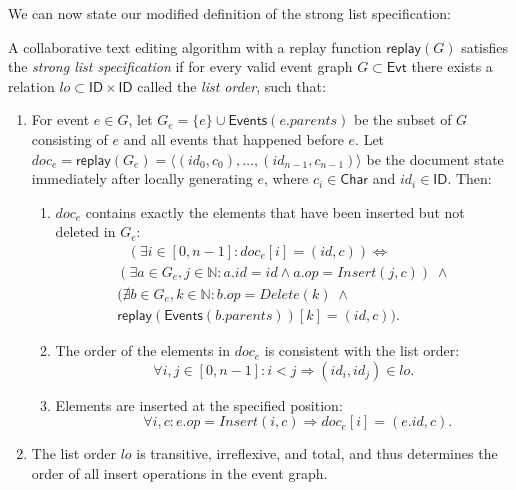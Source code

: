 \documentclass[sigplan,10pt]{acmart}
\begin{document}
We can now state our modified definition of the strong list specification:

\begin{definition}\label{strong-list-spec}
  A collaborative text editing algorithm with a replay function $\mathsf{replay}(G)$ satisfies the \emph{strong list specification} if for every valid event graph $G \subset \mathsf{Evt}$ there exists a relation $\mathit{lo} \subset \mathsf{ID} \times \mathsf{ID}$ called the \emph{list order}, such that:
  \begin{enumerate}
    \item For event $e \in G$, let $G_e = \{e\} \cup \mathsf{Events}(e.\mathit{parents})$ be the subset of $G$ consisting of $e$ and all events that happened before $e$.
    Let $\mathit{doc}_e = \mathsf{replay}(G_e) = \langle (\mathit{id}_0, c_0), \dots, (\mathit{id}_{n-1}, c_{n-1}) \rangle$ be the document state immediately after locally generating $e$, where $c_i \in \mathsf{Char}$ and $\mathit{id}_i \in \mathsf{ID}$. Then:
      \begin{enumerate}
        \item $\mathit{doc}_e$ contains exactly the elements that have been inserted but not deleted in $G_e$:
         \begin{multline*}
             \hspace{9pt}(\exists i \in [0, n-1]: \mathit{doc}_e [i] = (\mathit{id}, c)) \Longleftrightarrow \\
             (\exists a \in G_e, j \in \mathbb{N}: a.\mathit{id} = \mathit{id} \wedge a.\mathit{op} = \mathit{Insert}(j,c)) \;\wedge \\
             (\nexists b \in G_e, k \in \mathbb{N}: b.\mathit{op} = \mathit{Delete}(k) \;\wedge \\
             \mathsf{replay}(\mathsf{Events}(b.\mathit{parents}))[k] = (\mathit{id}, c)).
         \end{multline*}
        \item The order of the elements in $\mathit{doc}_e$ is consistent with the list order:
          \begin{equation*}
            \forall i, j \in [0, n-1]: i<j \Longrightarrow (\mathit{id}_i, \mathit{id}_j) \in \mathit{lo}.
          \end{equation*}
        \item Elements are inserted at the specified position:
          \begin{equation*}
            \qquad\forall i, c: e.\mathit{op} = \mathit{Insert}(i,c) \Longrightarrow \mathit{doc}_e [i] = (e.\mathit{id}, c).
          \end{equation*}
      \end{enumerate}
    \item The list order $\mathit{lo}$ is transitive, irreflexive, and total, and thus determines the order of all insert operations in the event graph.
  \end{enumerate}
\end{definition}
\end{document}
